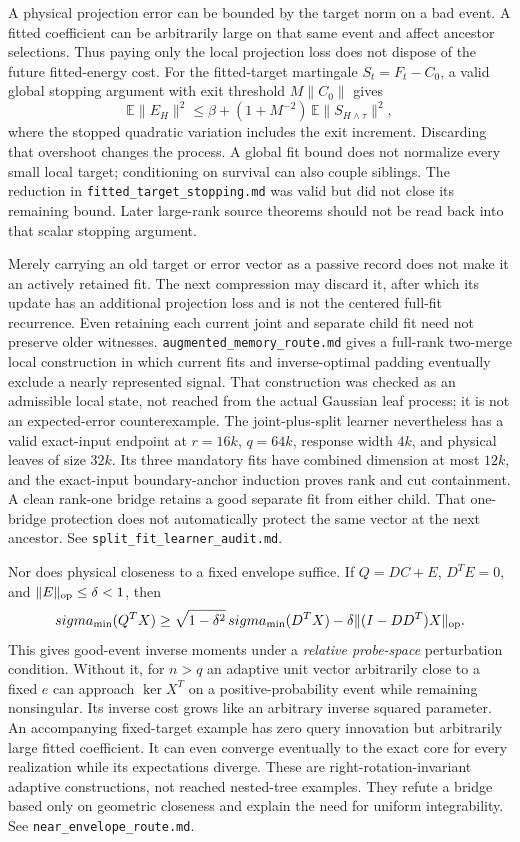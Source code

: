 \documentclass[11pt,oneside,openany,a4paper]{report}
\numberwithin{equation}{chapter}
\theoremstyle{definition}
\theoremstyle{remark}
\newcommand{\sourcefile}[1]{{\small\nolinkurl{#1}}}
\begin{document}
A physical projection error can be bounded by the target norm on a bad
event.  A fitted coefficient can be arbitrarily large on that same
event and affect ancestor selections.  Thus paying only the local
projection loss does not dispose of the future fitted-energy cost.
For the fitted-target martingale $S_t=F_t-C_0$, a valid global stopping
argument with exit threshold $M\|C_0\|$ gives
\[
 \mathbb E\|E_H\|^2\le
 \beta+(1+M^{-2})\,
 \mathbb E\|S_{H\wedge\tau}\|^2,
\]
where the stopped quadratic variation includes the exit increment.
Discarding that overshoot changes the process.  A global fit bound does
not normalize every small local target; conditioning on survival can
also couple siblings.  The reduction in
\sourcefile{fitted_target_stopping.md} was valid but did not close its
remaining bound.  Later large-rank source theorems should not be read
back into that scalar stopping argument.

Merely carrying an old target or error vector as a passive record
does not make it an actively retained fit.  The next compression may
discard it, after which its update has an additional projection loss
and is not the centered full-fit recurrence.  Even retaining each
current joint and separate child fit need not preserve older witnesses.
\sourcefile{augmented_memory_route.md} gives a full-rank two-merge
local construction in which current fits and inverse-optimal padding
eventually exclude a nearly represented signal.  That construction
was checked as an admissible local state, not reached from the actual
Gaussian leaf process; it is not an expected-error counterexample.
The joint-plus-split learner nevertheless has a valid exact-input
endpoint at $r=16k$, $q=64k$, response width $4k$, and physical leaves
of size $32k$.  Its three mandatory fits have combined dimension at
most $12k$, and the exact-input boundary-anchor induction proves rank
and cut containment.  A clean rank-one bridge retains a good separate
fit from either child.  That one-bridge protection does not automatically
protect the same vector at the next ancestor.
See \sourcefile{split_fit_learner_audit.md}.

Nor does physical closeness to a fixed envelope suffice.  If
$Q=DC+E$, $D^TE=0$, and $\|E\|_{\rm op}\le\delta<1$, then
\[
 \sigma_{\min}(Q^TX)\ge
 \sqrt{1-\delta^2}\,\sigma_{\min}(D^TX)
   -\delta\|(I-DD^T)X\|_{\rm op}.
\]
This gives good-event inverse moments under a \emph{relative
probe-space} perturbation condition.  Without it, for $n>q$ an adaptive
unit vector arbitrarily close to a fixed $e$ can approach
$\ker X^T$ on a positive-probability event while remaining nonsingular.
Its inverse cost grows like an arbitrary inverse squared parameter.
An accompanying fixed-target example has zero query innovation but
arbitrarily large fitted coefficient.  It can even converge eventually
to the exact core for every realization while its expectations diverge.
These are right-rotation-invariant adaptive constructions, not reached
nested-tree examples.  They refute a bridge based only on geometric
closeness and explain the need for uniform integrability.
See \sourcefile{near_envelope_route.md}.
\end{document}

